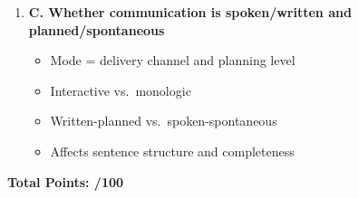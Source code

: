 \documentclass[11pt]{article}
\begin{document}
\begin{enumerate}
\item \textbf{C. Whether communication is spoken/written and planned/spontaneous}
\begin{itemize}
    \item Mode = delivery channel and planning level
    \item Interactive vs.\ monologic
    \item Written-planned vs.\ spoken-spontaneous
    \item Affects sentence structure and completeness
\end{itemize}

\end{enumerate}

\vspace{1cm}
\noindent \textbf{Total Points: /100}
\end{document}
